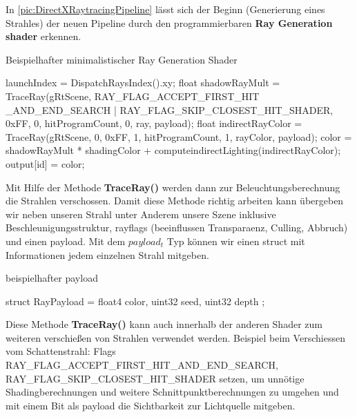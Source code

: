 In \ref{pic:DirectXRaytracingPipeline} lässt sich der Beginn (Generierung eines Strahles) der neuen Pipeline
durch den programmierbaren \textbf{Ray Generation shader} erkennen.

\begin{algorithm}[H]
    \caption{Beispielhafter minimalistischer Ray Generation Shader}
    \begin{algorithmic}[1]
        \State launchIndex = DispatchRaysIndex().xy;
            \State float shadowRayMult = TraceRay(gRtScene,
            RAY\_FLAG\_ACCEPT\_FIRST\_HIT \_AND\_END\_SEARCH |
            RAY\_FLAG\_SKIP\_CLOSEST\_HIT\_SHADER,
            0xFF, 0, hitProgramCount, 0, ray, payload);
            \State float indirectRayColor = TraceRay(gRtScene, 0, 0xFF, 1, hitProgramCount, 1, rayColor, payload);
            \State color = shadowRayMult * shadingColor + computeindirectLighting(indirectRayColor);
        \EndFor
        \State output[id] = color;
    \end{algorithmic}
    \label{alg:Ray Gen}
\end{algorithm}

Mit Hilfe der Methode \textbf{TraceRay()} werden dann zur Beleuchtungsberechnung 
die Strahlen verschossen. Damit diese Methode richtig arbeiten kann übergeben wir neben unseren Strahl 
unter Anderem  unsere Szene inklusive Beschleunigungsstruktur, rayflags 
(beeinflussen Transparaenz, Culling, Abbruch)\cite{RayFlags} und einen payload.
Mit dem \textit{$payload_t$} Typ können wir einen struct mit Informationen jedem einzelnen Strahl mitgeben.

\begin{algorithm}[H]
    \caption{beispielhafter payload}
    \begin{algorithmic}[1]
        \State struct RayPayload = {
            \State        float4 color, uint32 seed, uint32 depth
            \State };
        \end{algorithmic}
        \label{alg:payload}
    \end{algorithm}
    
Diese Methode \textbf{TraceRay()} kann auch innerhalb der anderen Shader zum weiteren verschießen
von Strahlen verwendet werden. Beispiel beim Verschiessen vom Schattenstrahl: Flags 
RAY\_FLAG\_ACCEPT\_FIRST\_HIT\_AND\_END\_SEARCH, \newline
RAY\_FLAG\_SKIP\_CLOSEST\_HIT\_SHADER setzen, um unnötige 
Shadingberechnungen und weitere Schnittpunktberechnungen zu umgehen und mit einem Bit als payload 
die Sichtbarkeit zur Lichtquelle mitgeben.


